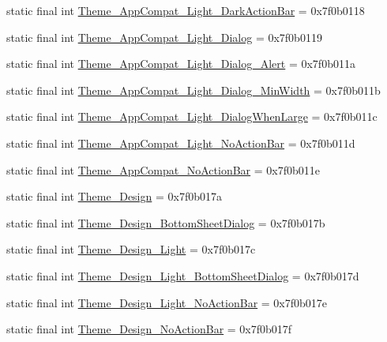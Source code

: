\begin{CompactItemize}
static final int \hyperlink{classandroid_1_1support_1_1coreutils_1_1_r_1_1style_49f2d5364f0fe0166f9c505c66bcbc47}{Theme\_\-AppCompat\_\-Light\_\-DarkActionBar} = 0x7f0b0118
\item 
static final int \hyperlink{classandroid_1_1support_1_1coreutils_1_1_r_1_1style_d16b4ff3a12d34ff2d1650f57eb124f5}{Theme\_\-AppCompat\_\-Light\_\-Dialog} = 0x7f0b0119
\item 
static final int \hyperlink{classandroid_1_1support_1_1coreutils_1_1_r_1_1style_8d68253e64b793dc411f6b667e1bd1eb}{Theme\_\-AppCompat\_\-Light\_\-Dialog\_\-Alert} = 0x7f0b011a
\item 
static final int \hyperlink{classandroid_1_1support_1_1coreutils_1_1_r_1_1style_ec0cd08973e15d86eda1f4bed10f5fb7}{Theme\_\-AppCompat\_\-Light\_\-Dialog\_\-MinWidth} = 0x7f0b011b
\item 
static final int \hyperlink{classandroid_1_1support_1_1coreutils_1_1_r_1_1style_6432954f95fdb34f99b054f16fa0c851}{Theme\_\-AppCompat\_\-Light\_\-DialogWhenLarge} = 0x7f0b011c
\item 
static final int \hyperlink{classandroid_1_1support_1_1coreutils_1_1_r_1_1style_7d18621321fa71460663a8f759309b2e}{Theme\_\-AppCompat\_\-Light\_\-NoActionBar} = 0x7f0b011d
\item 
static final int \hyperlink{classandroid_1_1support_1_1coreutils_1_1_r_1_1style_a1098dc9891ca8253ea08e9837cc7d51}{Theme\_\-AppCompat\_\-NoActionBar} = 0x7f0b011e
\item 
static final int \hyperlink{classandroid_1_1support_1_1coreutils_1_1_r_1_1style_d0c3b413cb57fa33a8c825123ad7f5af}{Theme\_\-Design} = 0x7f0b017a
\item 
static final int \hyperlink{classandroid_1_1support_1_1coreutils_1_1_r_1_1style_0cff25f3aa199e0bd97a53da01785657}{Theme\_\-Design\_\-BottomSheetDialog} = 0x7f0b017b
\item 
static final int \hyperlink{classandroid_1_1support_1_1coreutils_1_1_r_1_1style_01bf0cb777735754783aafee863efa6a}{Theme\_\-Design\_\-Light} = 0x7f0b017c
\item 
static final int \hyperlink{classandroid_1_1support_1_1coreutils_1_1_r_1_1style_4c80c6c8f0217f783e9893f254b06d37}{Theme\_\-Design\_\-Light\_\-BottomSheetDialog} = 0x7f0b017d
\item 
static final int \hyperlink{classandroid_1_1support_1_1coreutils_1_1_r_1_1style_bba0cdbaa0f163e5238f03955add3c19}{Theme\_\-Design\_\-Light\_\-NoActionBar} = 0x7f0b017e
\item 
static final int \hyperlink{classandroid_1_1support_1_1coreutils_1_1_r_1_1style_0ce6d91f4469052e3060214f19d3eef9}{Theme\_\-Design\_\-NoActionBar} = 0x7f0b017f

\end{CompactItemize}
